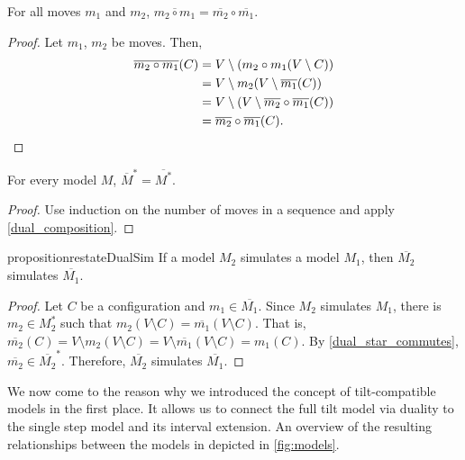 \documentclass[a4paper,UKenglish,cleveref,thm-restate]{lipics-v2021}
\newcommand{\dual}[1]{\ensuremath{\overline{#1}}\xspace}
\begin{document}
\begin{lemma}
    \label{dual_composition}
    For all moves $m_1$ and $m_2$, \(\dual{m_2 \circ m_1} = \dual{m_2} \circ
    \dual{m_1}\).
\end{lemma}
\begin{proof}
    Let $m_1$, $m_2$ be moves. Then,
    \begin{align*}
        \dual{m_2 \circ m_1}(C) &= V \setminus (m_2 \circ m_1(V \setminus C)) \\
        &= V \setminus m_2(V \setminus \dual{m_1}(C)) \\
        &= V \setminus (V \setminus \dual{m_2} \circ \dual{m_1}(C))\\
        &= \dual{m_2} \circ \dual{m_1}(C). \qedhere
    \end{align*}
\end{proof}

\begin{proposition}
    \label{dual_star_commutes}
    For every model $M$, \(\dual{M}^* = \dual{M^*}\).
\end{proposition}
\begin{proof}
    Use induction on the number of moves in a sequence and apply
    \cref{dual_composition}.
\end{proof}

\begin{restatable}{proposition}{restateDualSim}\label{dual_simulation}
If a model $M_2$ simulates a model $M_1$, then $\dual{M_2}$ simulates
$\dual{M_1}$.
\end{restatable}
\begin{proof}
    Let $C$ be a configuration and $m_1 \in \dual{M_1}$. Since $M_2$ simulates
    $M_1$, there is $m_2 \in M_2^*$ such that \(m_2(V \setminus C) = \dual{m_1}(V
    \setminus C)\). That is, \(\dual{m_2}(C) = V \setminus m_2(V \setminus C) = V
    \setminus \dual{m_1}(V \setminus C) = m_1(C)\). By \cref{dual_star_commutes},
    \(\dual{m_2} \in \dual{M_2}^*\). Therefore, \dual{M_2} simulates \dual{M_1}.
\end{proof}

We now come to the reason why we introduced the concept of tilt-compatible
models in the first place. It allows us to connect the full tilt model via
duality to the single step model and its interval extension. An overview of the
resulting relationships between the models in depicted in \cref{fig:models}.
\end{document}
